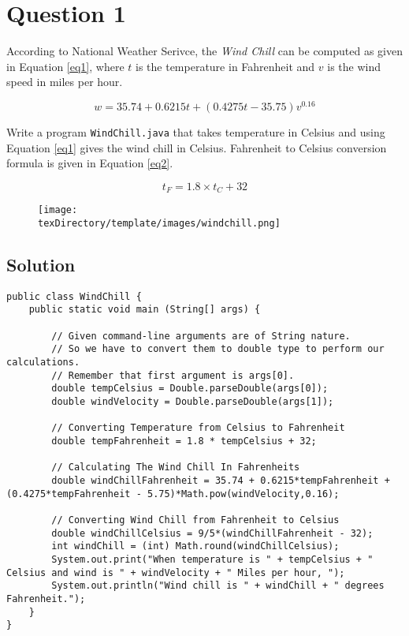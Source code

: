 \documentclass[12pt,letterpaper,twoside]{article}
\begin{document}


\section*{Question 1}

According to National Weather Serivce, the \textit{Wind Chill} can be computed as given in Equation \ref{eq1}, where $t$ is the temperature in Fahrenheit and $v$ is the wind speed in miles per hour.

\begin{equation}
w = 35.74 + 0.6215 t + (0.4275t-35.75)v^{0.16}
\label{eq1}
\end{equation}

Write a program \texttt{WindChill.java} that takes temperature in Celsius and using Equation \ref{eq1} gives the wind chill in Celsius.
Fahrenheit to Celsius conversion formula is given in Equation \ref{eq2}.

\begin{equation}
t_F = 1.8 \times t_C + 32
\label{eq2}
\end{equation}

\begin{figure}[H]\centering
	\texttt{[image: \\texDirectory/template/images/windchill.png]}
\end{figure}

\subsection*{Solution}

\lstset{language=Java}
\begin{lstlisting}
public class WindChill {
	public static void main (String[] args) {

		// Given command-line arguments are of String nature.
		// So we have to convert them to double type to perform our calculations.
		// Remember that first argument is args[0].
		double tempCelsius = Double.parseDouble(args[0]);
		double windVelocity = Double.parseDouble(args[1]);

		// Converting Temperature from Celsius to Fahrenheit
		double tempFahrenheit = 1.8 * tempCelsius + 32;

		// Calculating The Wind Chill In Fahrenheits
		double windChillFahrenheit = 35.74 + 0.6215*tempFahrenheit + (0.4275*tempFahrenheit - 5.75)*Math.pow(windVelocity,0.16);

		// Converting Wind Chill from Fahrenheit to Celsius
		double windChillCelsius = 9/5*(windChillFahrenheit - 32);
		int windChill = (int) Math.round(windChillCelsius);
		System.out.print("When temperature is " + tempCelsius + " Celsius and wind is " + windVelocity + " Miles per hour, ");
		System.out.println("Wind chill is " + windChill + " degrees Fahrenheit.");
	}
}
\end{lstlisting}
\end{document}
